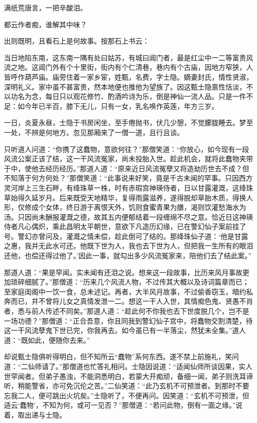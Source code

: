 满纸荒唐言，一把辛酸泪。

都云作者痴，谁解其中味？

出则既明，且看石上是何故事。按那石上书云：

当日地陷东南，这东南一隅有处曰姑苏，有城曰阊门者，最是红尘中一二等富贵风流之地。这阊门外有个十里街，街内有个仁清巷，巷内有个古庙，因地方窄狭，人皆呼作葫芦庙。庙旁住着一家乡宦，姓甄，名费，字士隐。嫡妻封氏，情性贤淑，深明礼义。家中虽不甚富贵，然本地便也推他为望族了。因这甄士隐禀性恬淡，不以功名为念，每日只以观花修竹、酌酒吟诗为乐，倒是神仙一流人品。只是一件不足：如今年已半百，膝下无儿，只有一女，乳名唤作英莲，年方三岁。

一日，炎夏永昼，士隐于书房闲坐，至手倦抛书，伏几少憩，不觉朦胧睡去。梦至一处，不辨是何地方。忽见那厢来了一僧一道，且行且谈。

只听道人问道：“你携了这蠢物，意欲何往？”那僧笑道：“你放心，如今现有一段风流公案正该了结，这一干风流冤家，尚未投胎入世。趁此机会，就将此蠢物夹带于中，使他去经历经历。”那道人道：“原来近日风流冤孽又将造劫历世去不成？但不知落于何方何处？”那僧笑道：“此事说来好笑，竟是千古未闻的罕事。只因西方灵河岸上三生石畔，有绛珠草一株，时有赤瑕宫神瑛侍者，日以甘露灌溉，这绛珠草始得久延岁月。后来既受天地精华，复得雨露滋养，遂得脱却草胎木质，得换人形，仅修成个女体，终日游于离恨天外，饥则食蜜青果为膳，渴则饮灌愁海水为汤。只因尚未酬报灌溉之德，故其五内便郁结着一段缠绵不尽之意。恰近日这神瑛侍者凡心偶炽，乘此昌明太平朝世，意欲下凡造历幻缘，已在警幻仙子案前挂了号。警幻亦曾问及，灌溉之情未偿，趁此倒可了结的。那绛珠仙子道：‘他是甘露之惠，我并无此水可还。他既下世为人，我也去下世为人，但把我一生所有的眼泪还他，也偿还得过他了。’因此一事，就勾出多少风流冤家来，陪他们去了结此案。”

那道人道：“果是罕闻。实未闻有还泪之说。想来这一段故事，比历来风月事故更加琐碎细腻了。”那僧道：“历来几个风流人物，不过传其大概以及诗词篇章而已；至家庭闺阁中一饮一食，总未述记。再者，大半风月故事，不过偷香窃玉，暗约私奔而已，并不曾将儿女之真情发泄一二。想这一干人入世，其情痴色鬼、贤愚不肖者，悉与前人传述不同矣。”那道人道：“趁此何不你我也去下世度脱几个，岂不是一场功德？”那僧道：“正合吾意，你且同我到警幻仙子宫中，将蠢物交割清楚，待这一干风流孽鬼下世已完，你我再去。如今虽已有一半落尘，然犹未全集。”道人道：“既如此，便随你去来。”

却说甄士隐俱听得明白，但不知所云“蠢物”系何东西。遂不禁上前施礼，笑问道：“二仙师请了。”那僧道也忙答礼相问。士隐因说道：“适闻仙师所谈因果，实人世罕闻者。但弟子愚浊，不能洞悉明白，若蒙大开痴顽，备细一闻，弟子则洗耳谛听，稍能警省，亦可免沉伦之苦。”二仙笑道：“此乃玄机不可预泄者。到那时不要忘我二人，便可跳出火坑矣。”士隐听了，不便再问。因笑道：“玄机不可预泄，但适云‘蠢物’，不知为何，或可一见否？”那僧道：“若问此物，倒有一面之缘。”说着，取出递与士隐。

